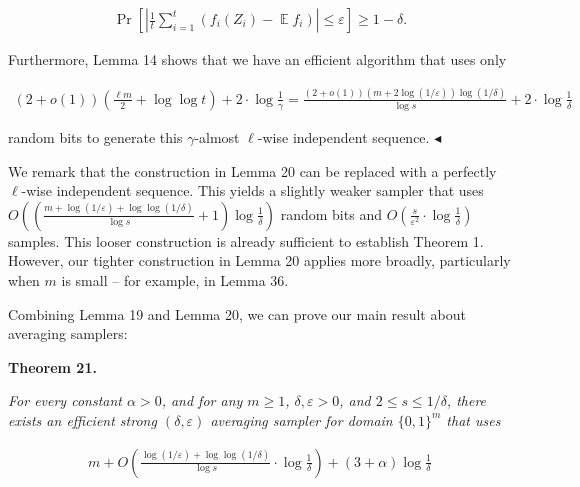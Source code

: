 \[\begin{gathered}
\Pr\left[\left|\frac{1}{t}\sum_{i=1}^{t}(f_{i}(Z_{i})-\operatorname*{\mathbb{E}}f_{i})\right|\leq\varepsilon\right]\geq 1-\delta.
\end{gathered}\]


Furthermore, Lemma 14 shows that we have an efficient algorithm that uses only\par


\[\begin{gathered}
(2+o(1))\left(\frac{\ell m}{2}+\log\log t\right)+2\cdot{\log\frac{1}{\gamma}}={\frac{(2+o(1))(m+2\log(1/\varepsilon))\log(1/\delta)}{\log s}}+2\cdot{\log\frac{1}{\delta}}
\end{gathered}\]


random bits to generate this $\gamma$-almost $\ell$-wise independent sequence.
$\blacktriangleleft$\par




We remark that the construction in Lemma 20 can be replaced with a perfectly $\ell$-wise independent sequence. This yields a slightly weaker sampler that uses
$O\left(\left(\frac{m+\log(1/\varepsilon)+\log\log(1/\delta)}{\log s}+1\right)\log\frac{1}{\delta}\right)$
random bits and
$O\left(\frac{s}{\varepsilon^{2}}\cdot\log\frac{1}{\delta}\right)$
samples.
This looser construction is already sufficient to establish Theorem 1. However, our tighter construction in Lemma 20 applies more broadly, particularly when $m$ is small – for example, in Lemma 36.\par




Combining Lemma 19 and Lemma 20, we can prove our main result about averaging samplers:\par





\par\medskip\noindent\textbf{
\textbf{Theorem 21}\textbf{.}
}\par



\emph{For every constant $\alpha>0$, and for any $m\geq 1$, $\delta,\varepsilon>0$, and $2\leq s\leq 1/\delta$, there exists an efficient strong $(\delta,\varepsilon)$ averaging sampler for domain $\{0,1\}^{m}$ that uses}\par


\[\begin{gathered}
m+O\left(\frac{\log(1/\varepsilon)+\log\log(1/\delta)}{\log s}\cdot\log\frac{1}{\delta}\right)+(3+\alpha)\log\frac{1}{\delta}
\end{gathered}\]


